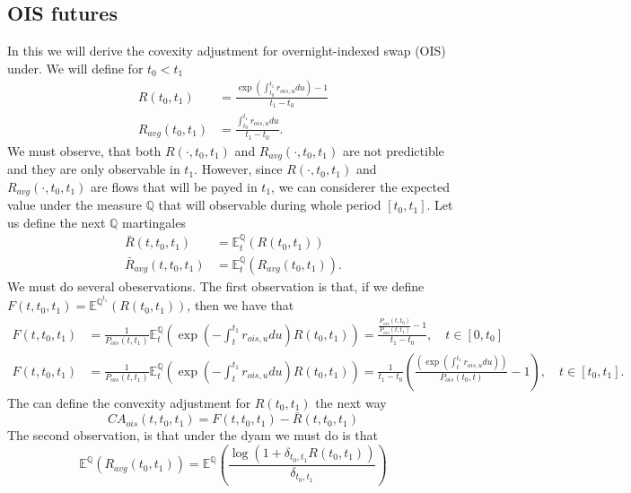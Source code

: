 \documentclass[a4paper,10pt]{article}
\newcommand{\1}{\mathbf{1}}
\begin{document}
\subsection{OIS futures}
In this we will derive the covexity adjustment for overnight-indexed swap (OIS) under. We will define for $t_0 < t_1$
\begin{align*}
R(t_0,t_1) &= \frac{\exp\left(\int_{t_0}^{t_1}r_{ois,u} du \right) - 1}{t_1 - t_0} \\
R_{avg}(t_0,t_1) &= \frac{\int_{t_0}^{t_1}r_{ois,u} du}{t_1 - t_0}.
\end{align*}
We must observe, that both $R(\cdot,t_0,t_1)$ and $R_{avg}(\cdot,t_0,t_1)$  are not predictible and they are only observable in $t_1$. However, since
$R(\cdot,t_0,t_1)$ and $R_{avg}(\cdot,t_0,t_1)$ are flows that will be payed in $t_1$, we can considerer the expected value under the measure $\mathbb{Q}$ that will observable during whole period $[t_0, t_1]$. Let us define the next $\mathbb{Q}$ martingales  
\begin{align*} 
\bar{R}(t,t_0,t_1) &= \mathbb{E}_t^{\mathbb{Q}}\left( R(t_0,t_1)  \right) \\
\bar{R}_{avg}(t,t_0,t_1) &= \mathbb{E}_t^{\mathbb{Q}}\left( R_{avg}(t_0,t_1)  \right).
\end{align*}
We must do several obeservations. The first observation is that, if we define $F(t,t_0,t_1) = \mathbb{E}^{\mathbb{Q}^{t_1}}\left( R(t_0,t_1)\right)$, then we have that
\begin{align*}
F(t,t_0,t_1)&= \frac{1}{P_{ois}(t,t_1)}  \mathbb{E}_{t}^{\mathbb{Q}}\left(\exp\left(-\int_{t}^{t_1} r_{ois,u} du \right) R(t_0,t_1) \right) = \frac{\frac{P_{ois}(t,t_0)}{P_{ois}(t,t_1)} - 1}{t_1 - t_0}, \quad t \in [0,t_0] \\
F(t,t_0,t_1)&= \frac{1}{P_{ois}(t,t_1)} \mathbb{E}_{t}^{\mathbb{Q}}\left(\exp\left(-\int_{t}^{t_1} r_{ois,u} du \right) R(t_0,t_1) \right) = \frac{1}{t_1 - t_0} \left(\frac{\left( \exp\left(\int_{t}^{t_1}r_{ois,u} du\right)\right)}{P_{ois}(t_0,t)}-1\right), \quad  t \in  [t_0, t_1].
\end{align*}
The can define the convexity adjustment for $ R(t_0,t_1)$ the next way
\begin{equation}\label{R_ois_ca}
CA_{ois}(t,t_0,t_1) = F(t,t_0,t_1) - \bar{R}(t,t_0,t_1) 
\end{equation}
The second observation, is that under the dyam we must do is that
\begin{equation}\label{R_ois_avg}
\mathbb{E}^{\mathbb{Q}}\left(R_{avg}(t_0,t_1) \right) = \mathbb{E}^{\mathbb{Q}}\left( \frac{\log\left(1+ \delta_{t_0,t_1} R(t_0,t_1) \right)}{\delta_{t_0,t_1}} \right)  
\end{equation}
\end{document}
